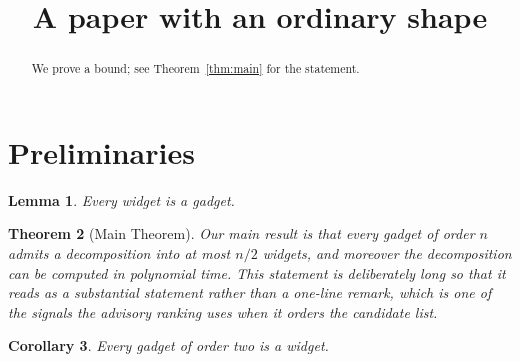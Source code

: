 \documentclass{article}
\newtheorem{theorem}{Theorem}
\newtheorem{lemma}[theorem]{Lemma}
\newtheorem{corollary}[theorem]{Corollary}
\begin{document}
\title{A paper with an ordinary shape}
\maketitle

\begin{abstract}
We prove a bound; see Theorem~\ref{thm:main} for the statement.
\end{abstract}



\section{Preliminaries}

\begin{lemma}\label{lem:key}
Every widget is a gadget.
\end{lemma}

\begin{theorem}[Main Theorem]\label{thm:main}
Our main result is that every gadget of order $n$ admits a decomposition into
at most $n/2$ widgets, and moreover the decomposition can be computed in
polynomial time. This statement is deliberately long so that it reads as a
substantial statement rather than a one-line remark, which is one of the
signals the advisory ranking uses when it orders the candidate list.
\end{theorem}

\begin{corollary}
Every gadget of order two is a widget.
\end{corollary}
\end{document}
